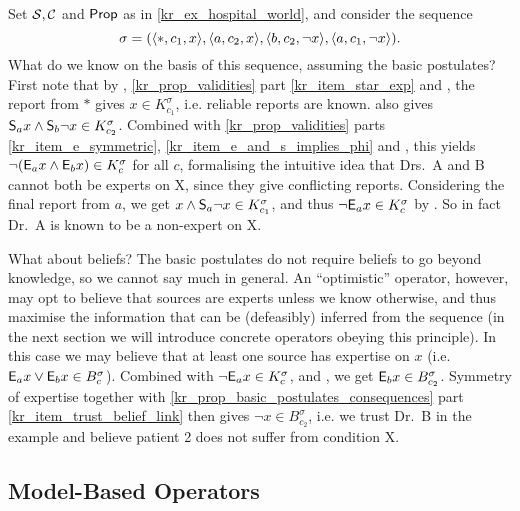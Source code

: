 \begin{example}
    \label{kr_ex_hospital_ex_formalised}
    Set $\srcs, \C$ and $\propvars$ as in \cref{kr_ex_hospital_world}, and consider
    the sequence
    \[
        \sigma
        = (
            \tuple{\ast, c_1, x},
            \tuple{a, c_2, x},
            \tuple{b, c_2, \neg x},
            \tuple{a, c_1, \neg x}
        ).
    \]
    What do we know on the basis of this sequence, assuming the basic
    postulates? First note that by \soundness{}, \cref{kr_prop_validities}
    part \cref{kr_item_star_exp} and \closure{}, the report from $\ast$ gives $x
    \in K^\sigma_{c_1}$, i.e. reliable reports are known. \soundness{} also
    gives $\S_a{x} \land \S_b{\neg x} \in K^\sigma_{c_2}$. Combined with
    \cref{kr_prop_validities} parts \cref{kr_item_e_symmetric},
    \cref{kr_item_e_and_s_implies_phi} and \closure{}, this yields
    $\neg(\E_a{x} \land \E_b{x}) \in K^\sigma_c$ for all $c$, formalising the
    intuitive idea that Drs.\ A and B cannot both be experts on X, since they
    give conflicting reports.
    Considering the final report from $a$, we get $x \land \S_a{\neg x} \in
    K^\sigma_{c_1}$, and thus $\neg \E_a{x} \in K^\sigma_c$ by
    \closure{}. So in fact Dr.\ A is known to be a non-expert on X.

    What about beliefs? The basic postulates do not require beliefs to go
    beyond knowledge, so we cannot say much in general. An ``optimistic''
    operator, however, may opt to believe that sources are experts unless we
    know otherwise, and thus maximise the information that can be (defeasibly)
    inferred from the sequence (in the next section we will introduce
    concrete operators obeying this principle). In this case we may believe
    that at least one source has expertise on $x$ (i.e. $\E_a{x} \lor \E_b{x} \in
    B^\sigma_c$).  Combined with $\neg \E_a{x} \in K^\sigma_c$, \closure{} and
    \containment{}, we get $\E_b{x} \in B^\sigma_{c_2}$. Symmetry of expertise
    together with \cref{kr_prop_basic_postulates_consequences} part
    \cref{kr_item_trust_belief_link} then gives $\neg x \in
    B^\sigma_{c_2}$, i.e. we trust Dr.\ B in the example and believe patient 2
    does not suffer from condition X.

\end{example}

\subsection{Model-Based Operators}

